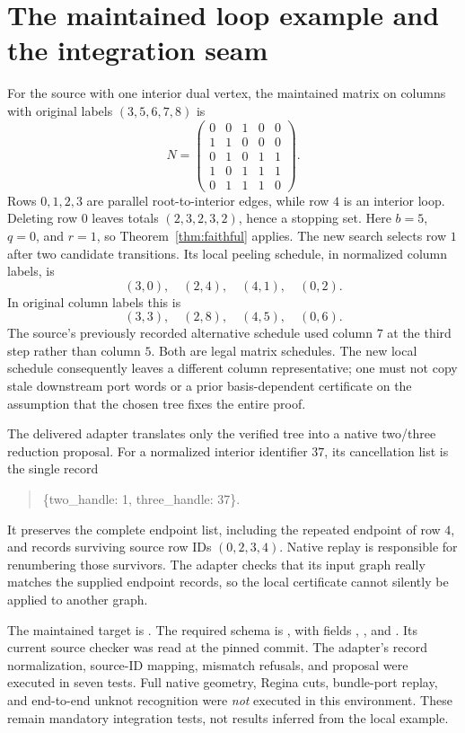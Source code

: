 \documentclass[11pt,letterpaper]{article}
\theoremstyle{definition}
\begin{document}
\section{The maintained loop example and the integration seam}\label{sec:native}
For the source with one interior dual vertex, the maintained matrix on
columns with original labels $(3,5,6,7,8)$ is \cite{loop}
\[
 N=\begin{pmatrix}
 0&0&1&0&0\\
 1&1&0&0&0\\
 0&1&0&1&1\\
 1&0&1&1&1\\
 0&1&1&1&0
 \end{pmatrix}.
\]
Rows $0,1,2,3$ are parallel root-to-interior edges, while row $4$ is an
interior loop. Deleting row $0$ leaves totals $(2,3,2,3,2)$, hence a stopping
set. Here $b=5$, $q=0$, and $r=1$, so Theorem~\ref{thm:faithful} applies.
The new search selects row $1$ after two candidate transitions. Its local
peeling schedule, in normalized column labels, is
\[
 (3,0),\quad(2,4),\quad(4,1),\quad(0,2).
\]
In original column labels this is
\[
 (3,3),\quad(2,8),\quad(4,5),\quad(0,6).
\]
The source's previously recorded alternative schedule used column $7$ at
the third step rather than column $5$. Both are legal matrix schedules.
The new local schedule consequently leaves a different column representative;
one must not copy stale downstream port words or a prior basis-dependent
certificate on the assumption that the chosen tree fixes the entire proof.

The delivered adapter translates only the verified tree into a native
two/three reduction proposal. For a normalized interior identifier $37$,
its cancellation list is the single record
\begin{quote}\ttfamily
\{two\_handle: 1, three\_handle: 37\}.
\end{quote}
It preserves the complete endpoint list, including the repeated endpoint
of row $4$, and records surviving source row IDs $(0,2,3,4)$. Native replay
is responsible for renumbering those survivors. The adapter checks that
its input graph really matches the supplied endpoint records, so the local
certificate cannot silently be applied to another graph.

The maintained target is
.
The required schema is , with fields
, , and
. Its current source checker was read at the
pinned commit. The adapter's record normalization, source-ID mapping,
mismatch refusals, and proposal were executed in seven tests. Full native
geometry, Regina cuts, bundle-port replay, and end-to-end unknot recognition
were \emph{not} executed in this environment. These remain mandatory
integration tests, not results inferred from the local example.
\end{document}
